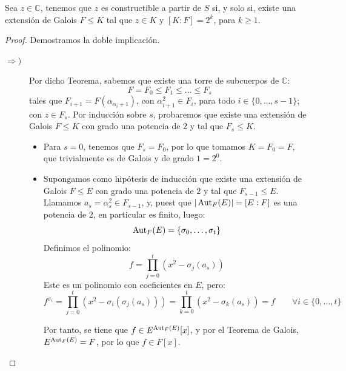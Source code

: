 \begin{teo}
    Sea $z\in \mathbb{C}$, tenemos que $z$ es constructible a partir de $S$ si, y solo si, existe una extensión de Galois $F\leq K$ tal que $z\in K$ y $[K:F] = 2^k$, para $k\geq 1$.
    \begin{proof}
        Demostramos la doble implicación.
        \begin{description}
            \item [$\Longrightarrow )$] Por dicho Teorema, sabemos que existe una torre de subcuerpos de $\mathbb{C}$:
                \begin{equation*}
                    F=F_0\leq F_1\leq \ldots \leq F_s
                \end{equation*}
                tales que $F_{i+1} = F(\alpha_{\alpha_i+1})$, con $\alpha_{i+1}^2 \in F_i$, para todo $i \in \{0,\ldots,s-1\}$; con $z\in F_s$. Por inducción sobre $s$, probaremos que existe una extensión de Galois $F\leq K$ con grado una potencia de $2$ y tal que $F_s\leq K$.
                \begin{itemize}
                    \item Para $s=0$, tenemos que $F_s = F_0$, por lo que tomamos $K = F_0=F$, que trivialmente es de Galois y de grado $1 = 2^0$.
                    \item Supongamos como hipótesis de inducción que existe una extensión de Galois $F\leq E$ con grado una potencia de $2$ y tal que $F_{s-1}\leq E$. Llamamos $a_s = \alpha_s^2\in F_{s-1}$, y, puest que $|\operatorname{Aut}_F(E)| = [E:F]$ es una potencia de $2$, en particular es finito, luego:
                        \begin{equation*}
                            \operatorname{Aut}_F(E) = \{\sigma_0, \ldots, \sigma_t\}
                        \end{equation*}
                        Definimos el polinomio:
                        \begin{equation*}
                            f = \prod_{j=0}^{t} (x^2-\sigma_j(a_s))
                        \end{equation*}
                        Este es un polinomio con coeficientes en $E$, pero:
                        \begin{equation*}
                            f^{\sigma_i} = \prod_{j=0}^{t} (x^2-\sigma_i(\sigma_j(a_s))) = \prod_{k=0}^{t} (x^2-\sigma_k(a_s)) = f\qquad \forall i \in \{0, \ldots, t\}
                        \end{equation*}

                        Por tanto, se tiene que $f\in E^{\operatorname{Aut}_F(E)}[x]$, y por el Teorema de Galois, $E^{\operatorname{Aut}_F(E)} = F$, por lo que $f\in F[x]$.\\
                        

\end{itemize}
\end{description}
\end{proof}
\end{teo}
